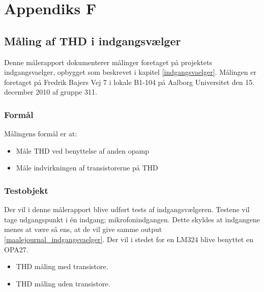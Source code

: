%
%
\chapter{Appendiks F}
\label{maalejournal_indgangsvaelger_2}
\section*{Måling af THD i indgangsvælger}
Denne målerapport dokumenterer målinger foretaget på projektets indgangsvaelger, opbygget som beskrevet i kapitel \ref{indgangsvaelger}. Målingen er foretaget på Fredrik Bajers Vej 7 i lokale B1-104 på Aalborg Universitet den 15. december 2010 af gruppe 311.

\subsection*{Formål}
Målingens formål er at:
\begin{itemize}
\item Måle THD ved benyttelse af anden opamp
\item Måle indvirkningen af transistorerne på THD
\end{itemize}

\subsection*{Testobjekt}
Der vil i denne målerapport blive udført tests af indgangsvælgeren. Testene vil tage udgangspunkt i én indgang; mikrofonindgangen. Dette skyldes at indgangene menes at være så ens, at de vil give samme output \ref{maalejournal_indgangsvaelger}. Der vil i stedet for en LM324 blive benyttet en OPA27.
\begin{itemize}
\item THD måling med transistore.
\item THD måling uden transistore.
\end{itemize}

